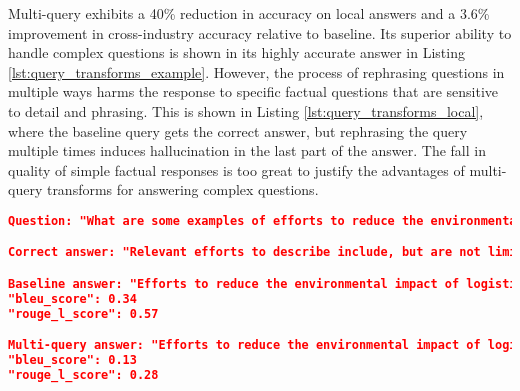Multi-query exhibits a 40\% reduction in accuracy on local answers and a 3.6\% improvement in cross-industry accuracy relative to baseline. Its superior ability to handle complex questions is shown in its highly accurate answer in Listing \ref{lst:query_transforms_example}. However, the process of rephrasing questions in multiple ways harms the response to specific factual questions that are sensitive to detail and phrasing. This is shown in Listing \ref{lst:query_transforms_local}, where the baseline query gets the correct answer, but rephrasing the query multiple times induces hallucination in the last part of the answer. The fall in quality of simple factual responses is too great to justify the advantages of multi-query transforms for answering complex questions.
\newpage
\begin{lstlisting}[language=json,firstnumber=1,label={lst:query_transforms_local},caption={Example local single-hop question with RAG answers using different query transforms}]
Question: "What are some examples of efforts to reduce the environmental impact of logistics for the Health Care Distributors industry?"

Correct answer: "Relevant efforts to describe include, but are not limited to, upgrades to fleet (fuel efficiency), usage of alternative and/or renewable fuels, optimized logistics routes, and idling reduction programs.",

Baseline answer: "Efforts to reduce the environmental impact of logistics for the Health Care Distributors industry may include upgrading to more fuel-efficient fleets, using alternative and/or renewable fuels, optimizing logistics routes, and implementing idling reduction programs."
"bleu_score": 0.34
"rouge_l_score": 0.57

Multi-query answer: "Efforts to reduce the environmental impact of logistics for the Health Care Distributors industry may include upgrading to more fuel-efficient fleets, using alternative and/or renewable fuels, optimizing logistics routes, implementing idling reduction programs, partnering with energy-efficient suppliers, and investing in smart logistics technologies to enhance route efficiency and decrease fuel consumption.",
"bleu_score": 0.13
"rouge_l_score": 0.28


\end{lstlisting}
